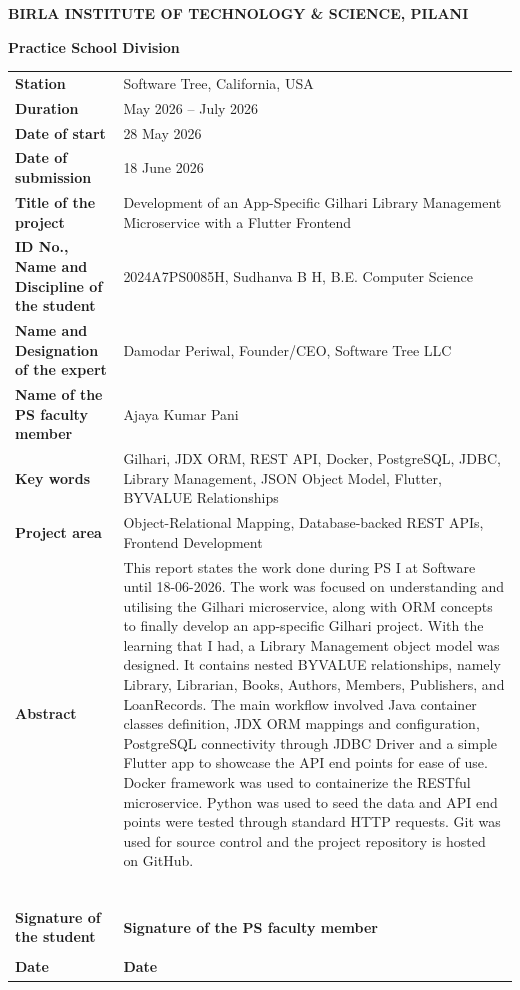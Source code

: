 \documentclass{book}
\begin{document}
	\centerline{\bf BIRLA INSTITUTE OF TECHNOLOGY \& SCIENCE, PILANI}
	\vspace*{0.2cm}
	\centerline{\bf Practice School Division}
	\vspace*{0.3cm}
		\begin{tabular}{p{4.5cm} p{10.5cm}}
			\textbf{Station} & Software Tree, California, USA \\ 
			\textbf{Duration} & May 2026 -- July 2026 \\ 
			\textbf{Date of start} & 28 May 2026 \\ 
			\textbf{Date of submission} & 18 June 2026 \\ 
			\textbf{Title of the project} & Development of an App-Specific Gilhari Library Management Microservice with a Flutter Frontend \\ 
			\textbf{ID No., Name and Discipline of the student} & 2024A7PS0085H, Sudhanva B H, B.E. Computer Science \\
			\textbf{Name and Designation of the expert} & Damodar Periwal, Founder/CEO, Software Tree LLC \\
			\textbf{Name of the PS faculty member} & Ajaya Kumar Pani \\
			\textbf{Key words} & Gilhari, JDX ORM, REST API, Docker, PostgreSQL, JDBC, Library Management, JSON Object Model, Flutter, BYVALUE Relationships \\ 
			\textbf{Project area} & Object-Relational Mapping, Database-backed REST APIs, Frontend Development \\ 
			\textbf{Abstract} & This report states the work done during PS I at Software until 18-06-2026. The work was focused on understanding and utilising the Gilhari microservice, along with ORM concepts to finally develop an app-specific Gilhari project. With the learning that I had, a Library Management object model was designed. It contains nested BYVALUE relationships, namely Library, Librarian, Books, Authors, Members, Publishers, and LoanRecords. The main workflow involved Java container classes definition, JDX ORM mappings and configuration, PostgreSQL connectivity through JDBC Driver and a simple Flutter app to showcase the API end points for ease of use. Docker framework was used to containerize the RESTful microservice. Python was used to seed the data and API end points were tested through standard HTTP requests. Git was used for source control and the project repository is hosted on GitHub. \\ 
			& \\
			& \\
			& \\
			& \\
			& \\
			& \\
			\textbf{Signature of the student} & \hspace*{2cm}\textbf{Signature of the PS faculty member} \\
			& \\
			\textbf{Date} & \hspace*{2cm}\textbf{Date} \\ 
		\end{tabular}
\end{document}
